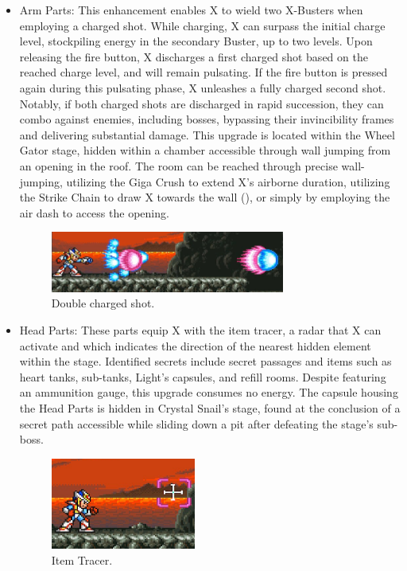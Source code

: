 \begin{itemize}
\item Arm Parts: This enhancement enables X to wield two X-Busters when employing a charged shot. While charging, X can surpass the initial charge level, stockpiling energy in the secondary Buster, up to two levels. Upon releasing the fire button, X discharges a first charged shot based on the reached charge level, and will remain pulsating. If the fire button is pressed again during this pulsating phase, X unleashes a fully charged second shot. Notably, if both charged shots are discharged in rapid succession, they can combo against enemies, including bosses, bypassing their invincibility frames and delivering substantial damage. This upgrade is located within the Wheel Gator stage, hidden within a chamber accessible through wall jumping from an opening in the roof. The room can be reached through precise wall-jumping, utilizing the Giga Crush to extend X's airborne duration, utilizing the Strike Chain to draw X towards the wall (), or simply by employing the air dash to access the opening.
	\begin{figure}[htp]
	\centering
	\includegraphics[height=2cm]{figures/X2/weapons/Double_shot.png}
	\caption{Double charged shot.}
\end{figure}
\item Head Parts: These parts equip X with the item tracer, a radar that X can activate and which indicates the direction of the nearest hidden element within the stage. Identified secrets include secret passages and items such as heart tanks, sub-tanks, Light's capsules, and refill rooms. Despite featuring an ammunition gauge, this upgrade consumes no energy. The capsule housing the Head Parts is hidden in Crystal Snail's stage, found at the conclusion of a secret path accessible while sliding down a pit after defeating the stage's sub-boss.
\begin{figure}[htp]
	\centering
	\includegraphics[height=3cm]{figures/X2/weapons/Tracer.png}
	\caption{Item Tracer.}
\end{figure}


\end{itemize}
